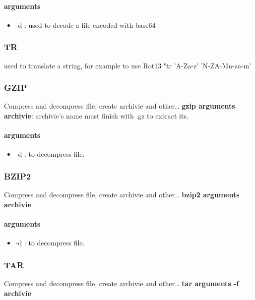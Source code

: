 \documentclass{article}
\begin{document}
                    \paragraph{arguments}
                    \begin{itemize}
                        \item -d : used to decode a file encoded with base64
                    \end{itemize}
                \subsubsection{TR}
                    used to translate a string, for example to use Rot13 "tr 'A-Za-z' 'N-ZA-Mn-za-m'
                 \subsubsection{GZIP}
                    Compress and decompress file, create archivie and other\dots
                    \textbf{gzip arguments archivie}: archivie's name must finish with .gz to extract its.
                    \paragraph{arguments}
                    \begin{itemize}
                        \item -d : to decompress file.
                    \end{itemize}
                \subsubsection{BZIP2}
                    Compress and decompress file, create archivie and other\dots
                    \textbf{bzip2 arguments archivie}
                    \paragraph{arguments}
                    \begin{itemize}
                        \item -d : to decompress file.
                    \end{itemize}
                \subsubsection{TAR}
                    Compress and decompress file, create archivie and other\dots
                    \textbf{tar arguments  -f archivie}
\end{document}
